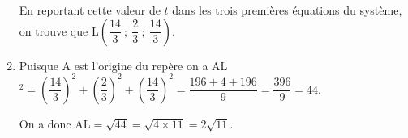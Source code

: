 \begin{enumerate}
En reportant cette valeur de $t$ dans les trois premières équations du système, on trouve que L$\left(\dfrac{14}{3}~;~ \dfrac{2}{3}~;~\dfrac{14}{3}\right)$.
\item %
Puisque A est l'origine du repère on a AL$^2 = \left(\dfrac{14}{3}\right)^2 + \left(\dfrac{2}{3}\right)^2 + \left(\dfrac{14}{3}\right)^2 =  \dfrac{196 + 4 + 196}{9} = \dfrac{396}{9} = 44$.

On a donc AL$ = \sqrt{44} = \sqrt{4 \times 11} = 2\sqrt{11}$.
\end{enumerate}


\bigskip

